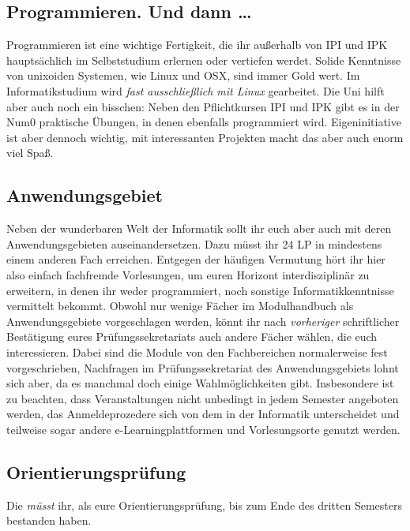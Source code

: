 \subsection{Programmieren. Und dann \dots}

Programmieren ist eine wichtige Fertigkeit, die ihr außerhalb von \gls{IPI} und \gls{IPK} hauptsächlich im Selbststudium erlernen oder vertiefen werdet. Solide Kenntnisse von unixoiden Systemen, wie Linux und OSX, sind immer Gold wert. Im Informatikstudium wird \emph{fast ausschließlich mit Linux} gearbeitet. Die Uni hilft aber auch noch ein bisschen: Neben den Pflichtkursen \gls{IPI} und \gls{IPK} gibt es in der \gls{Num0} praktische Übungen, in denen ebenfalls programmiert wird. Eigeninitiative ist aber dennoch wichtig, mit interessanten Projekten macht das aber auch enorm viel Spaß.

\subsection{Anwendungsgebiet}

Neben der wunderbaren Welt der Informatik sollt ihr euch aber auch mit deren Anwendungsgebieten auseinandersetzen. Dazu müsst ihr 24 \gls{LP} in mindestens einem anderen Fach erreichen. Entgegen der häufigen Vermutung hört ihr hier also einfach fachfremde Vorlesungen, um euren Horizont interdisziplinär zu erweitern, in denen ihr weder programmiert, noch sonstige Informatikkenntnisse vermittelt bekommt. Obwohl nur wenige Fächer im Modulhandbuch als Anwendungsgebiete vorgeschlagen werden, könnt ihr nach \emph{vorheriger} schriftlicher Bestätigung eures Prüfungssekretariats auch andere Fächer wählen, die euch interessieren. Dabei sind die Module von den Fachbereichen normalerweise fest vorgeschrieben, Nachfragen im Prüfungssekretariat des Anwendungsgebiets lohnt sich aber, da es manchmal doch einige Wahlmöglichkeiten gibt. Insbesondere ist zu beachten, dass Veranstaltungen nicht unbedingt in jedem Semester angeboten werden, das Anmeldeprozedere sich von dem in der Informatik unterscheidet und teilweise sogar andere e-Learningplattformen und Vorlesungsorte genutzt werden.

\subsection{Orientierungsprüfung}

Die  \emph{müsst} ihr, als eure Orientierungsprüfung, bis zum Ende des dritten Semesters bestanden haben.


